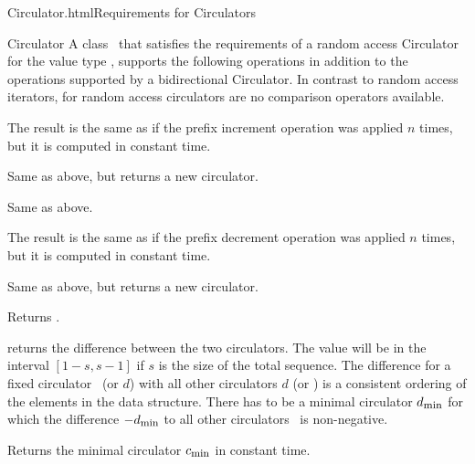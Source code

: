 \begin{ccHtmlClassFile}{Circulator.html}{Requirements for Circulators}
\begin{ccClass}{Circulator}
A class \ccClassName\ that satisfies the requirements of a random
access Circulator for the value type , supports the
following operations in addition to the operations supported by a
bidirectional Circulator.  In contrast to random access iterators, for
random access circulators are no comparison operators available.

\ccTypes
{}


\ccPropagateThreeToTwoColumns
{}
\ccOperations

{The result is the same as if the prefix increment operation 
 was applied $n$ times, but it is computed in constant time.}

{Same as above, but returns a new circulator.}

\def\ccTagRmEigenClassName{\ccTrue}
{Same as above.}
\def\ccTagRmEigenClassName{\ccFalse}

{The result is the same as if the prefix decrement operation 
 was applied $n$ times, but it is computed in constant time.}

{Same as above, but returns a new circulator.}


{Returns .}

{returns the difference between the two circulators. The value will be
  in the interval $\left[ 1-s , s-1 \right]$ if $s$ is the size of the
  total sequence. The difference for a fixed circulator \ccVar\ (or
  $d$) with all other circulators $d$ (or \ccVar) is a consistent
  ordering of the elements in the data structure. There has to be a
  minimal circulator $d_{\mbox{\footnotesize min}}$ for which the
  difference \ccVar $- d_{\mbox{\footnotesize min}}$ to all other
  circulators \ccVar\ is non-negative.}

{Returns the minimal circulator $c_{\mbox{\footnotesize min}}$
  in constant time.} 

\end{ccClass} 
\end{ccHtmlClassFile} 

